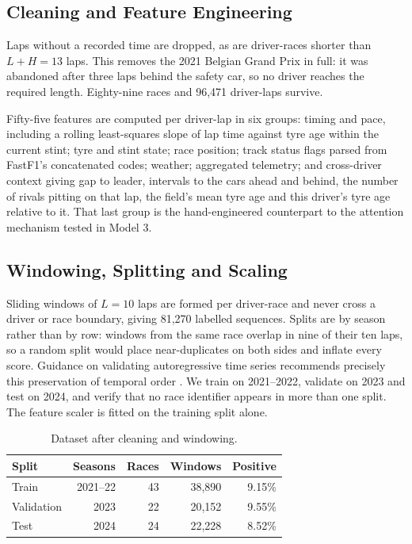 \documentclass[conference]{IEEEtran}
\begin{document}
\subsection{Cleaning and Feature Engineering}

Laps without a recorded time are dropped, as are driver-races shorter than $L+H=13$ laps. This removes the 2021 Belgian Grand Prix in full: it was abandoned after three laps behind the safety car, so no driver reaches the required length. Eighty-nine races and 96{,}471 driver-laps survive.

Fifty-five features are computed per driver-lap in six groups: timing and pace, including a rolling least-squares slope of lap time against tyre age within the current stint; tyre and stint state; race position; track status flags parsed from FastF1's concatenated codes; weather; aggregated telemetry; and cross-driver context giving gap to leader, intervals to the cars ahead and behind, the number of rivals pitting on that lap, the field's mean tyre age and this driver's tyre age relative to it. That last group is the hand-engineered counterpart to the attention mechanism tested in Model 3.

\subsection{Windowing, Splitting and Scaling}

Sliding windows of $L=10$ laps are formed per driver-race and never cross a driver or race boundary, giving 81{,}270 labelled sequences. Splits are by season rather than by row: windows from the same race overlap in nine of their ten laps, so a random split would place near-duplicates on both sides and inflate every score. Guidance on validating autoregressive time series recommends precisely this preservation of temporal order \cite{bergmeir2018timeseries}. We train on 2021--2022, validate on 2023 and test on 2024, and verify that no race identifier appears in more than one split. The feature scaler is fitted on the training split alone.

\begin{table}[t]
\centering
\caption{Dataset after cleaning and windowing.}
\label{tab:data}
\small
\begin{tabular}{lrrrr}
\toprule
Split & Seasons & Races & Windows & Positive \\
\midrule
Train      & 2021--22 & 43 & 38{,}890 & 9.15\% \\
Validation & 2023     & 22 & 20{,}152 & 9.55\% \\
Test       & 2024     & 24 & 22{,}228 & 8.52\% \\
\bottomrule
\end{tabular}
\end{table}
\end{document}
